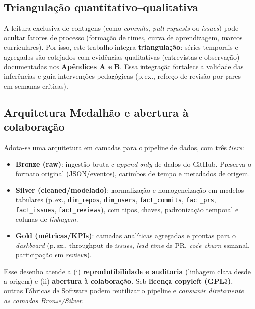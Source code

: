 \documentclass[
	12pt,
	openright,
	oneside,
	a4paper,
	brazil
]{abntex2}
\begin{document}
\subsection{Triangulação quantitativo--qualitativa}
A leitura exclusiva de contagens (como \emph{commits}, \emph{pull requests} ou \emph{issues}) pode ocultar fatores de processo (formação de times, curva de aprendizagem, marcos curriculares). Por isso, este trabalho integra \textbf{triangulação}: séries temporais e agregados são cotejados com evidências qualitativas (entrevistas e observação) documentadas nos \textbf{Apêndices A e B}. Essa integração fortalece a validade das inferências e guia intervenções pedagógicas (p.\,ex., reforço de revisão por pares em semanas críticas).

\subsection{Arquitetura Medalhão e abertura à colaboração}
Adota-se uma arquitetura em camadas para o pipeline de dados, com três \emph{tiers}:
\begin{itemize}
    \item \textbf{Bronze (raw)}: ingestão bruta e \emph{append-only} de dados do GitHub. Preserva o formato original (JSON/eventos), carimbos de tempo e metadados de origem.
    \item \textbf{Silver (cleaned/modelado)}: normalização e homogeneização em modelos tabulares (p.\,ex., \texttt{dim\_repos}, \texttt{dim\_users}, \texttt{fact\_commits}, \texttt{fact\_prs}, \texttt{fact\_issues}, \texttt{fact\_reviews}), com tipos, chaves, padronização temporal e colunas de \emph{linhagem}.
    \item \textbf{Gold (métricas/KPIs)}: camadas analíticas agregadas e prontas para o \emph{dashboard} (p.\,ex., throughput de \emph{issues}, \emph{lead time} de PR, \emph{code churn} semanal, participação em \emph{reviews}).
\end{itemize}

\noindent Esse desenho atende a (i) \textbf{reprodutibilidade e auditoria} (linhagem clara desde a origem) e (ii) \textbf{abertura à colaboração}. Sob \textbf{licença copyleft (GPL3)}, outras Fábricas de Software podem reutilizar o pipeline e \emph{consumir diretamente as camadas Bronze/Silver}.
\end{document}
